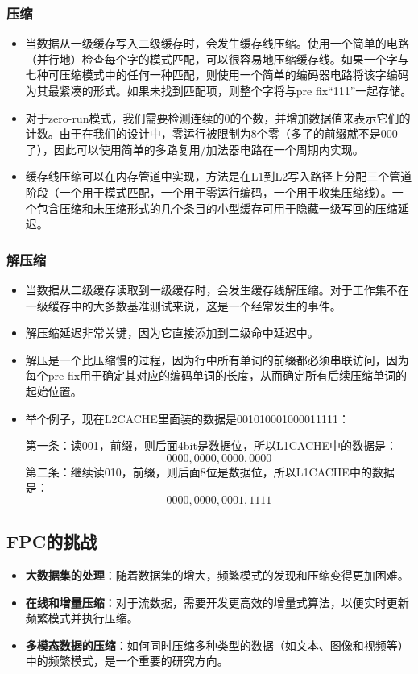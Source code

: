 \documentclass[12pt]{article}
\begin{document}
\subsubsection{压缩}
\begin{itemize}
  \item 当数据从一级缓存写入二级缓存时，会发生缓存线压缩。使用一个简单的电路（并行地）检查每个字的模式匹配，可以很容易地压缩缓存线。如果一个字与七种可压缩模式中的任何一种匹配，则使用一个简单的编码器电路将该字编码为其最紧凑的形式。如果未找到匹配项，则整个字将与pre fix“111”一起存储。
  \item 对于zero-run模式，我们需要检测连续的0的个数，并增加数据值来表示它们的计数。由于在我们的设计中，零运行被限制为8个零（多了的前缀就不是000了），因此可以使用简单的多路复用/加法器电路在一个周期内实现。
  \item 缓存线压缩可以在内存管道中实现，方法是在L1到L2写入路径上分配三个管道阶段（一个用于模式匹配，一个用于零运行编码，一个用于收集压缩线）。一个包含压缩和未压缩形式的几个条目的小型缓存可用于隐藏一级写回的压缩延迟。
\end{itemize}

\subsubsection{解压缩}
\begin{itemize}
  \item 当数据从二级缓存读取到一级缓存时，会发生缓存线解压缩。对于工作集不在一级缓存中的大多数基准测试来说，这是一个经常发生的事件。
  \item 解压缩延迟非常关键，因为它直接添加到二级命中延迟中。
  \item 解压是一个比压缩慢的过程，因为行中所有单词的前缀都必须串联访问，因为每个pre-fix用于确定其对应的编码单词的长度，从而确定所有后续压缩单词的起始位置。
  \item 举个例子，现在L2CACHE里面装的数据是001010001000011111：

  第一条：读001，前缀，则后面4bit是数据位，所以L1CACHE中的数据是：
  \[
  0000, 0000, 0000, 0000
  \]
  第二条：继续读010，前缀，则后面8位是数据位，所以L1CACHE中的数据是：
  \[
  0000, 0000, 0001, 1111
  \]
\end{itemize}

\subsection{FPC的挑战}

\begin{itemize}
  \item \textbf{大数据集的处理}：随着数据集的增大，频繁模式的发现和压缩变得更加困难。
  \item \textbf{在线和增量压缩}：对于流数据，需要开发更高效的增量式算法，以便实时更新频繁模式并执行压缩。
  \item \textbf{多模态数据的压缩}：如何同时压缩多种类型的数据（如文本、图像和视频等）中的频繁模式，是一个重要的研究方向。
\end{itemize}
\end{document}
